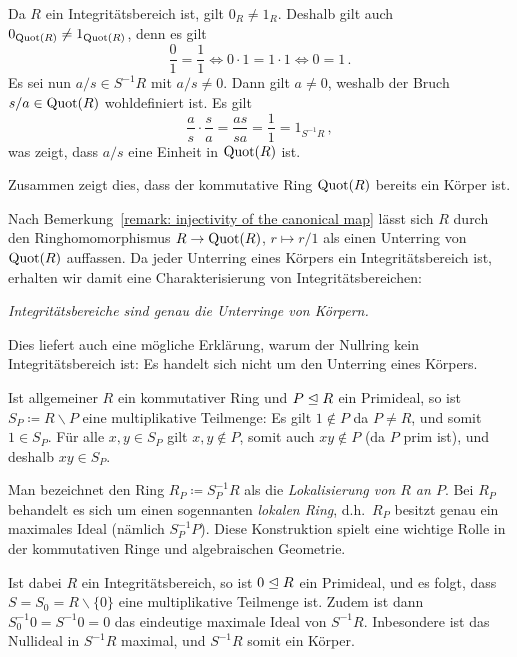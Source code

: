 Da $R$ ein Integritätsbereich ist, gilt $0_R \neq 1_R$.
Deshalb gilt auch $0_{\operatorname{Quot}(R)} \neq 1_{\operatorname{Quot}(R)}$, denn es gilt
\[
        \frac{0}{1} = \frac{1}{1}
  \iff  0 \cdot 1 = 1 \cdot 1
  \iff  0 = 1 \,.
\]
Es sei nun $a/s \in S^{-1} R$ mit $a/s \neq 0$.
Dann gilt $a \neq 0$, weshalb der Bruch $s/a \in \operatorname{Quot}(R)$ wohldefiniert ist.
Es gilt
\[
    \frac{a}{s} \cdot \frac{s}{a}
  = \frac{as}{sa}
  = \frac{1}{1}
  = 1_{S^{-1} R} \,,
\]
was zeigt, dass $a/s$ eine Einheit in $\operatorname{Quot}(R)$ ist.

Zusammen zeigt dies, dass der kommutative Ring $\operatorname{Quot}(R)$ bereits ein Körper ist.

\begin{remark}
  Nach Bemerkung~\ref{remark: injectivity of the canonical map} lässt sich $R$ durch den Ringhomomorphismus $R \to \operatorname{Quot}(R)$, $r \mapsto r/1$ als einen Unterring von $\operatorname{Quot}(R)$ auffassen.
  Da jeder Unterring eines Körpers ein Integritätsbereich ist, erhalten wir damit eine Charakterisierung von Integritätsbereichen:
  \begin{center}
    \emph{Integritätsbereiche sind genau die Unterringe von Körpern.}
  \end{center}
  
  Dies liefert auch eine mögliche Erklärung, warum der Nullring kein Integritätsbereich ist:
  Es handelt sich nicht um den Unterring eines Körpers.
\end{remark}

\begin{remark}
  Ist allgemeiner $R$ ein kommutativer Ring und $P \trianglelefteq R$ ein Primideal, so ist $S_P \coloneqq R \smallsetminus P$ eine multiplikative Teilmenge:
  Es gilt $1 \notin P$ da $P \neq R$, und somit $1 \in S_P$.
  Für alle $x, y \in S_P$ gilt $x, y \notin P$, somit auch $xy \notin P$ (da $P$ prim ist), und deshalb $xy \in S_P$.
  
  Man bezeichnet den Ring $R_P \coloneqq S_P^{-1} R$ als die \emph{Lokalisierung von $R$ an $P$}.
  Bei $R_P$ behandelt es sich um einen sogennanten \emph{lokalen Ring}, d.h.\ $R_P$ besitzt genau ein maximales Ideal (nämlich $S_P^{-1} P$).
  Diese Konstruktion spielt eine wichtige Rolle in der kommutativen Ringe und algebraischen Geometrie.
  
  Ist dabei $R$ ein Integritätsbereich, so ist $0 \trianglelefteq R$ ein Primideal, und es folgt, dass $S = S_0 = R \smallsetminus \{0\}$ eine multiplikative Teilmenge ist.
  Zudem ist dann $S_0^{-1} 0 = S^{-1} 0 = 0$ das eindeutige maximale Ideal von $S^{-1} R$.
  Inbesondere ist das Nullideal in $S^{-1} R$ maximal, und $S^{-1} R$ somit ein Körper.
\end{remark}
